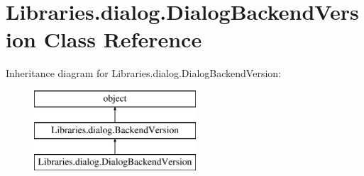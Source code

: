 \hypertarget{class_libraries_1_1dialog_1_1_dialog_backend_version}{}\section{Libraries.\+dialog.\+Dialog\+Backend\+Version Class Reference}
\label{class_libraries_1_1dialog_1_1_dialog_backend_version}
Inheritance diagram for Libraries.\+dialog.\+Dialog\+Backend\+Version\+:\begin{figure}[H]
\begin{center}
\leavevmode
\includegraphics[height=3.000000cm]{class_libraries_1_1dialog_1_1_dialog_backend_version}
\end{center}
\end{figure}
